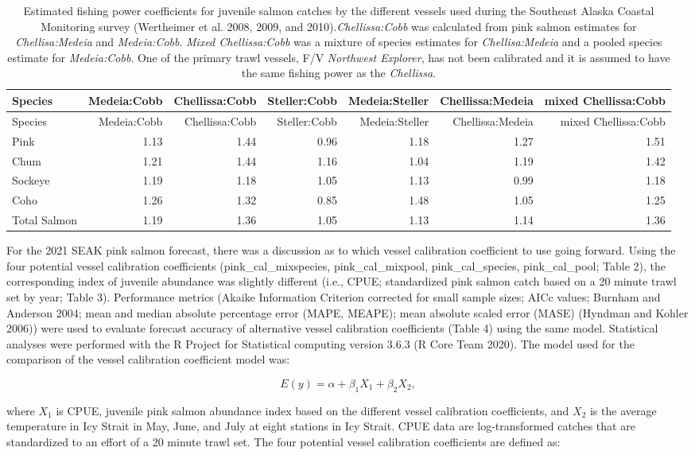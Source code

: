 \documentclass[]{article}
\begin{document}
\begin{longtable}[]{@{}lrrrrrr@{}}
\caption{Estimated fishing power coefficients for juvenile salmon
catches by the different vessels used during the Southeast Alaska
Coastal Monitoring survey (Wertheimer et al. 2008, 2009, and
2010).\emph{Chellissa:Cobb} was calculated from pink salmon estimates
for \emph{Chellisa:Medeia} and \emph{Medeia:Cobb}. \emph{Mixed
Chellissa:Cobb} was a mixture of species estimates for
\emph{Chellisa:Medeia} and a pooled species estimate for
\emph{Medeia:Cobb}. One of the primary trawl vessels, F/V
\emph{Northwest Explorer}, has not been calibrated and it is assumed to
have the same fishing power as the \emph{Chellissa}.}\tabularnewline
\toprule
Species & Medeia:Cobb & Chellissa:Cobb & Steller:Cobb & Medeia:Steller &
Chellissa:Medeia & mixed Chellissa:Cobb\tabularnewline
\midrule
\endfirsthead
\toprule
Species & Medeia:Cobb & Chellissa:Cobb & Steller:Cobb & Medeia:Steller &
Chellissa:Medeia & mixed Chellissa:Cobb\tabularnewline
\midrule
\endhead
Pink & 1.13 & 1.44 & 0.96 & 1.18 & 1.27 & 1.51\tabularnewline
Chum & 1.21 & 1.44 & 1.16 & 1.04 & 1.19 & 1.42\tabularnewline
Sockeye & 1.19 & 1.18 & 1.05 & 1.13 & 0.99 & 1.18\tabularnewline
Coho & 1.26 & 1.32 & 0.85 & 1.48 & 1.05 & 1.25\tabularnewline
Total Salmon & 1.19 & 1.36 & 1.05 & 1.13 & 1.14 & 1.36\tabularnewline
\bottomrule
\end{longtable}

For the 2021 SEAK pink salmon forecast, there was a discussion as to
which vessel calibration coefficient to use going forward. Using the
four potential vessel calibration coefficients (pink\_cal\_mixspecies,
pink\_cal\_mixpool, pink\_cal\_species, pink\_cal\_pool; Table 2), the
corresponding index of juvenile abundance was slightly different (i.e.,
CPUE; standardized pink salmon catch based on a 20 minute trawl set by
year; Table 3). Performance metrics (Akaike Information Criterion
corrected for small sample sizes; AICc values; Burnham and Anderson
2004; mean and median absolute percentage error (MAPE, MEAPE); mean
absolute scaled error (MASE) (Hyndman and Kohler 2006)) were used to
evaluate forecast accuracy of alternative vessel calibration
coefficients (Table 4) using the same model. Statistical analyses were
performed with the R Project for Statistical computing version 3.6.3 (R
Core Team 2020). The model used for the comparison of the vessel
calibration coefficient model was:

\[E(y) = \alpha + \beta_1{X_1} + \beta_2{X_2},\]

where \({X_1}\) is CPUE, juvenile pink salmon abundance index based on
the different vessel calibration coefficients, and \({X_2}\) is the
average temperature in Icy Strait in May, June, and July at eight
stations in Icy Strait. CPUE data are log-transformed catches that are
standardized to an effort of a 20 minute trawl set. The four potential
vessel calibration coefficients are defined as:
\end{document}
